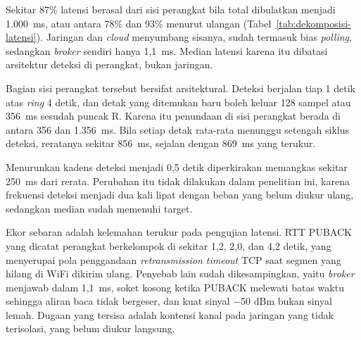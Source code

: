 Sekitar 87\% latensi berasal dari sisi perangkat bila total dibulatkan menjadi 1.000~ms, atau antara 78\% dan 93\% menurut ulangan (Tabel~\ref{tab:dekomposisi-latensi}). Jaringan dan \textit{cloud} menyumbang sisanya, sudah termasuk bias \textit{polling}, sedangkan \textit{broker} sendiri hanya 1,1~ms. Median latensi karena itu dibatasi arsitektur deteksi di perangkat, bukan jaringan.

Bagian sisi perangkat tersebut bersifat arsitektural. Deteksi berjalan tiap 1 detik atas \textit{ring} 4 detik, dan detak yang ditemukan baru boleh keluar 128 sampel atau 356~ms sesudah puncak R. Karena itu penundaan di sisi perangkat berada di antara 356 dan 1.356~ms. Bila setiap detak rata-rata menunggu setengah siklus deteksi, reratanya sekitar 856~ms, sejalan dengan 869~ms yang terukur.

Menurunkan kadens deteksi menjadi 0,5 detik diperkirakan memangkas sekitar 250~ms dari rerata. Perubahan itu tidak dilakukan dalam penelitian ini, karena frekuensi deteksi menjadi dua kali lipat dengan beban yang belum diukur ulang, sedangkan median sudah memenuhi target.

Ekor sebaran adalah kelemahan terukur pada pengujian latensi. RTT PUBACK yang dicatat perangkat berkelompok di sekitar 1,2, 2,0, dan 4,2 detik, yang menyerupai pola penggandaan \textit{retransmission timeout} TCP saat segmen yang hilang di WiFi dikirim ulang. Penyebab lain sudah dikesampingkan, yaitu \textit{broker} menjawab dalam 1,1~ms, soket kosong ketika PUBACK melewati batas waktu sehingga aliran baca tidak bergeser, dan kuat sinyal $-$50 dBm bukan sinyal lemah. Dugaan yang tersisa adalah kontensi kanal pada jaringan yang tidak terisolasi, yang belum diukur langsung.

